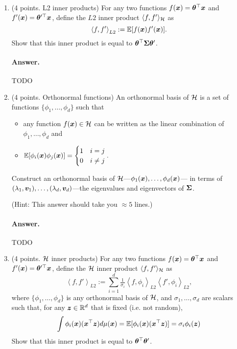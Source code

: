 \documentclass[11pt,letterpaper]{article}
\newenvironment{answer}{%
    \vspace{1em}
    \color{black}
    \paragraph{Answer.}
  }{%
    \vspace{1em}
  }
\begin{document}
\begin{enumerate}

  \item (4 points. L2 inner products)
    For any two functions $f({\bm{x}}) = {\bm{\theta}}^\top {\bm{x}}$ and $f'({\bm{x}}) = {\bm{\theta}}^{\prime\top} {\bm{x}}$,
    define the $L2$ inner product $\langle f, f' \rangle_{\mathcal{H}}$ as
    $$ \left\langle f, f' \right\rangle_{L2} := \mathbb{E}[ f({\bm{x}}) f'({\bm{x}}) ]. $$
    Show that this inner product is equal to ${\bm{\theta}}^\top {\bm{\Sigma}} {\bm{\theta}}'$.

\begin{answer}
  TODO
\end{answer}

  \item (4 points. Orthonormal functions)
    An orthonormal basis of $\mathcal{H}$ is a set of functions $\{ \phi_1, \ldots, \phi_d \}$ such that
    \begin{itemize}
      \item any function $f({\bm{x}}) \in \mathcal{H}$ can be written as the linear combination of $\phi_1, \ldots, \phi_d$ and
      \item $\mathbb{E}[ \phi_i({\bm{x}}) \phi_j({\bm{x}}) ]= \begin{cases} 1 & i=j \\ 0 & i \ne j \end{cases}.$
    \end{itemize}
    Construct an orthonormal basis of $\mathcal{H}$---$\phi_1({\bm{x}}), \ldots, \phi_d({\bm{x}})$---%
    in terms of $(\lambda_1, {\bm{v}}_1), \ldots, (\lambda_d, {\bm{v}}_d)$---the eigenvalues and eigenvectors of ${\bm{\Sigma}}$.

    (Hint: This answer should take you $\approx 5$ lines.)

\begin{answer}
  TODO
\end{answer}

  \item (4 points. $\mathcal{H}$ inner products)
    For any two functions $f({\bm{x}}) = {\bm{\theta}}^\top {\bm{x}}$ and $f'({\bm{x}}) = {\bm{\theta}}^{\prime\top} {\bm{x}}$,
    define the $\mathcal{H}$ inner product $\langle f, f' \rangle_{\mathcal{H}}$ as
    $$ \left\langle f, f' \right\rangle_{L2} := \sum_{i=1}^d
      \tfrac{1}{\sigma_i}
      \left\langle f, \phi_i \right\rangle_{L2}
      \left\langle f', \phi_i \right\rangle_{L2},
    $$
    where $\{ \phi_1, \ldots, \phi_d \}$ is any orthonormal basis of $\mathcal{H}$,
    and $\sigma_1, \ldots, \sigma_d$ are scalars such that, for any ${\bm{z}} \in \mathbb{R}^d$ that is fixed (i.e. not random),
    $$
      \int \phi_i({\bm{x}}) ({\bm{x}}^\top {\bm{z}}) d\mu({\bm{x}}) = \mathbb{E}[ \phi_i({\bm{x}}) ({\bm{x}}^\top {\bm{z}})] = \sigma_i \phi_i({\bm{z}})
    $$
    Show that this inner product is equal to ${\bm{\theta}}^\top {\bm{\theta}}'$.


\end{enumerate}
\end{document}
